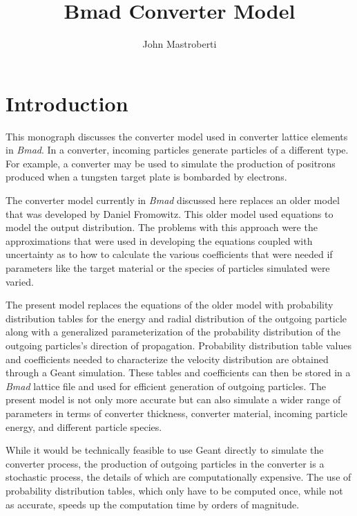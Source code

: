 \documentclass[12pt]{article}
\newcommand{\bmad}{\textit{Bmad}\xspace}
\begin{document}
\title{Bmad Converter Model}
\author{John Mastroberti}

\maketitle

\tableofcontents

\newpage

\section{Introduction}

This monograph discusses the converter model used in converter lattice elements in \bmad. In a
converter, incoming particles generate particles of a different type. For example, a converter may
be used to simulate the production of positrons produced when a tungsten target plate is bombarded
by electrons.

The converter model currently in \bmad discussed here replaces an older model that was developed by
Daniel Fromowitz\cite{b:fromowitz}. This older model used equations to model the output
distribution.  The problems with this approach were the approximations that were used in developing
the equations coupled with uncertainty as to how to calculate the various coefficients that were
needed if parameters like the target material or the species of particles simulated were varied.

The present model replaces the equations of the older model with probability distribution tables for
the energy and radial distribution of the outgoing particle along with a generalized
parameterization of the probability distribution of the outgoing particles's direction of
propagation.  Probability distribution table values and coefficients needed to characterize the
velocity distribution are obtained through a Geant\cite{geant} simulation. These tables and
coefficients can then be stored in a \bmad lattice file and used for efficient generation of
outgoing particles. The present model is not only more accurate but can also simulate a wider range
of parameters in terms of converter thickness, converter material, incoming particle energy, and
different particle species.

While it would be technically feasible to use Geant directly to simulate the converter process, the
production of outgoing particles in the converter is a stochastic process, the details of which are
computationally expensive. The use of probability distribution tables, which only have to be
computed once, while not as accurate, speeds up the computation time by orders of magnitude.
\end{document}
